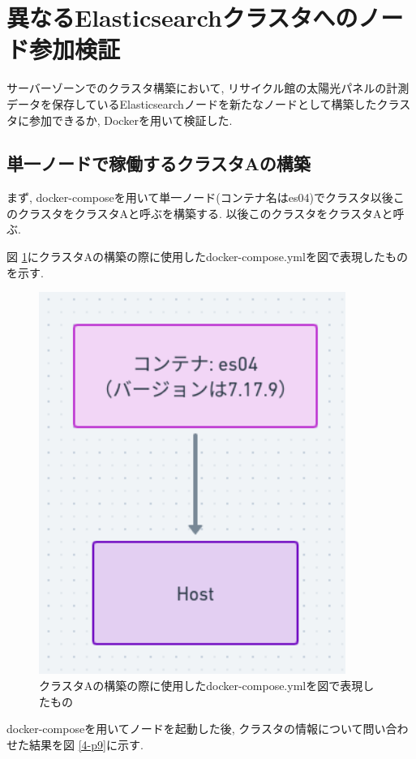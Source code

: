 \section{異なるElasticsearchクラスタへのノード参加検証}
サーバーゾーンでのクラスタ構築において, リサイクル館の太陽光パネルの計測データを保存しているElasticsearchノードを新たなノードとして構築したクラスタに参加できるか, Dockerを用いて検証した.

\subsection{単一ノードで稼働するクラスタAの構築}

まず, docker-composeを用いて単一ノード(コンテナ名はes04)でクラスタ以後このクラスタをクラスタAと呼ぶを構築する. 以後このクラスタをクラスタAと呼ぶ.

図 \ref{4-p8}にクラスタAの構築の際に使用したdocker-compose.ymlを図で表現したものを示す.

\begin{figure}
  \begin{center}
    \includegraphics[width=100mm]{sotu/figure/1-7.17.9.png}
    \caption{クラスタAの構築の際に使用したdocker-compose.ymlを図で表現したもの}
    \label{4-p8}
  \end{center}
\end{figure}

docker-composeを用いてノードを起動した後, クラスタの情報について問い合わせた結果を図 \ref{4-p9}に示す.

